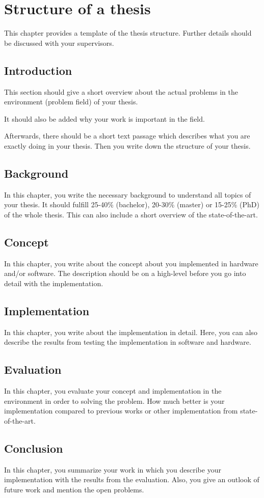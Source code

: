 \chapter{Structure of a thesis}
This chapter provides a template of the thesis structure. Further details should be discussed with your supervisors.
\section{Introduction}
This section should give a short overview about the actual problems in the environment (problem field) of your thesis.

It should also be added why your work is important in the field.

Afterwards, there should be a short text passage which describes what you are exactly doing in your thesis. Then you write down the structure of your thesis.
\section{Background}
In this chapter, you write the necessary background to understand all topics of your thesis. It should fulfill 25-40\% (bachelor), 20-30\% (master) or 15-25\% (PhD) of the whole thesis. This can also include a short overview of the state-of-the-art.
\section{Concept}
In this chapter, you write about the concept about you implemented in hardware and/or software. The description should be on a high-level before you go into detail with the implementation.
\section{Implementation}
In this chapter, you write about the implementation in detail. Here, you can also describe the results from testing the implementation in software and hardware. 
\section{Evaluation}
In this chapter, you evaluate your concept and implementation in the environment in order to solving the problem. How much better is your implementation compared to previous works or other implementation from state-of-the-art.
\section{Conclusion}
In this chapter, you summarize your work in which you describe your implementation with the results from the evaluation. Also, you give an outlook of future work and mention the open problems.